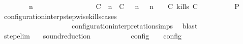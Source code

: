 \begin{isabellebody}
\ \ \ \ \ \ \ {\isacartoucheopen}{\isacharparenleft}{\isasymGamma}\ n\ {\isasymturnstile}\ {\isasymPsi}\ {\isasymtriangleright}\ {\isasymPhi}\ {\isacharequal}\isanewline
\ \ \ \ \ \ \ \ \ \ \ \ {\isacharparenleft}{\isacharparenleft}{\isacharparenleft}C\ {\isasymUp}\ n{\isacharparenright}\ {\isacharhash}\ {\isacharparenleft}C\ {\isasymnot}{\isasymUp}\ {\isasymge}\ n{\isacharparenright}\ {\isacharhash}\ {\isasymGamma}{\isacharparenright}{\isacharcomma}\ n\ {\isasymturnstile}\ {\isasymPsi}\ {\isasymtriangleright}\ {\isacharparenleft}{\isacharparenleft}C\ kills\ C\ {\isacharhash}\ {\isasymPhi}{\isacharparenright}{\isacharparenright}{\isacartoucheclose}\isanewline
\ \ \ \ \ \ \isamarkupfalse%
\ {\isacharquery}P\ \isamarkupfalse%
\ configuration{\isacharunderscore}interp{\isacharunderscore}stepwise{\isacharunderscore}kills{\isacharunderscore}cases\isanewline
\ \ \ \ \ \ \ \ \ \ \ \ \ \ \ \ \ \ \ \ configuration{\isacharunderscore}interpretation{\isachardot}simps\ \isamarkupfalse%
\ blast\isanewline
\ \ \ \ \isamarkupfalse%
\isanewline
\ \ \isamarkupfalse%
\isanewline
{}\isamarkupfalse%
%
\endisatagproof
{\isafoldproof}%
%
\isadelimproof
\isanewline
%
\endisadelimproof
\isanewline
{}\isamarkupfalse%
\ step{\isacharunderscore}elim{\isacharcolon}{\isacartoucheopen}{\isasymS}\ {\isasymhookrightarrow}\ {\isasymS}\isanewline
\isanewline
{}\isamarkupfalse%
\ sound{\isacharunderscore}reduction{\isacharprime}{\isacharcolon}\isanewline
\ \ \ {\isacartoucheopen}{\isasymS}\ {\isasymhookrightarrow}\ {\isasymS}\isanewline
\ \ \ {\isacartoucheopen}{\isasymlbrakk}\ {\isasymS}\ {\isasymrbrakk}\isactrlsub c\isactrlsub o\isactrlsub n\isactrlsub f\isactrlsub i\isactrlsub g\ {\isasymsupseteq}\ {\isasymlbrakk}\ {\isasymS}\ {\isasymrbrakk}\isactrlsub c\isactrlsub o\isactrlsub n\isactrlsub f\isactrlsub i\isactrlsub g{\isacartoucheclose}\isanewline
%
\isadelimproof
%
\endisadelimproof
%
\isatagproof
{}\isamarkupfalse%

\end{isabellebody}

